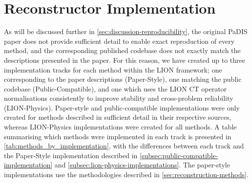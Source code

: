 \section{Reconstructor Implementation}
\label{sec:methods-reconstructor-implementation}

As will be discussed further in \autoref{sec:discussion-reproducibility}, the original PaDIS paper does not provide sufficient detail to enable exact reproduction of every method, and the corresponding published codebase does not exactly match the descriptions presented in the paper. For this reason, we have created up to three implementation tracks for each method within the LION framework; one corresponding to the paper descriptions (Paper-Style), one matching the public codebase (Public-Compatible), and one which uses the LION CT operator normalisations consistently to improve stability and cross-problem reliability (LION-Physics). Paper-style and public-compatible implementations were only created for methods described in sufficient detail in their respective sources, whereas LION-Physics implementations were created for all methods. A table summarising which methods were implemented in each track is presented in \autoref{tab:methods_by_implementation}, with the differences between each track and the Paper-Style implementation described in \autoref{subsec:public-compatible-implementation} and \autoref{subsec:lion-physics-implementations}. The paper-style implementations use the methodologies described in \autoref{sec:reconstruction-methods}.

